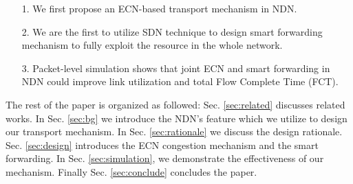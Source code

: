\begin{enumerate}
	\item[1.] We first propose an ECN-based transport mechanism in NDN.
	\item[2.] We are the first to utilize SDN technique to design smart forwarding mechanism to fully exploit the resource in the whole network.
	\item[3.] Packet-level simulation shows that joint ECN and smart forwarding in NDN could improve link utilization and total Flow Complete Time (FCT).
\end{enumerate}


The rest of the paper is organized as followed: Sec. \ref{sec:related} discusses related works. In Sec. \ref{sec:bg} we introduce the NDN's feature which we utilize to design our transport mechanism. In Sec. \ref{sec:rationale} we discuss the design rationale. Sec. \ref{sec:design} introduces the ECN congestion mechanism and the smart forwarding. In Sec. \ref{sec:simulation}, we demonstrate the effectiveness of our mechanism. Finally Sec. \ref{sec:conclude} concludes the paper.

